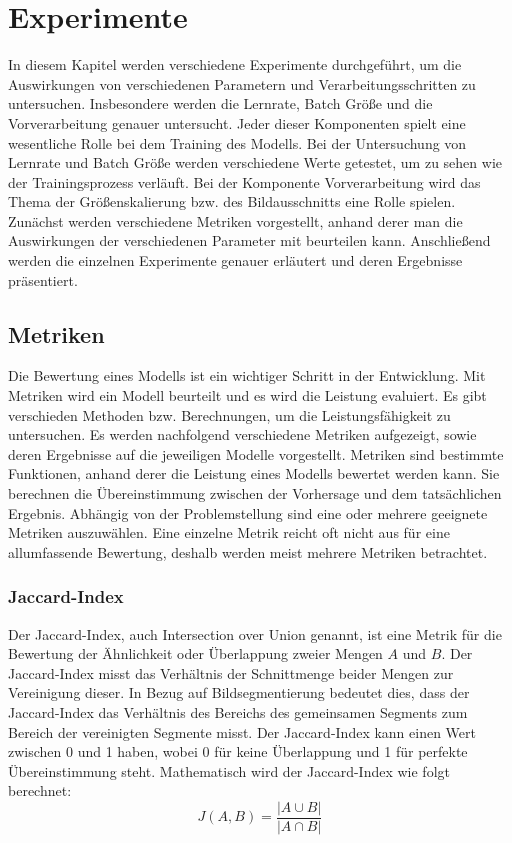 \chapter{Experimente}
In diesem Kapitel werden verschiedene Experimente durchgeführt, um die Auswirkungen von verschiedenen Parametern und Verarbeitungsschritten zu untersuchen. Insbesondere werden die Lernrate, Batch Größe und die Vorverarbeitung genauer untersucht. Jeder dieser Komponenten spielt eine wesentliche Rolle bei dem Training des \gls{Modell}s. Bei der Untersuchung von Lernrate und Batch Größe werden verschiedene Werte getestet, um zu sehen wie der Trainingsprozess verläuft. Bei der Komponente Vorverarbeitung wird das Thema der Größenskalierung bzw. des Bildausschnitts eine Rolle spielen.\\
Zunächst werden verschiedene Metriken vorgestellt, anhand derer man die Auswirkungen der verschiedenen Parameter mit beurteilen kann. Anschließend werden die einzelnen Experimente genauer erläutert und deren Ergebnisse präsentiert.

\section{Metriken}
Die Bewertung eines \gls{Modell}s ist ein wichtiger Schritt in der Entwicklung. Mit Metriken wird ein \gls{Modell} beurteilt und es wird die Leistung evaluiert. Es gibt verschieden Methoden bzw. Berechnungen, um die Leistungsfähigkeit zu untersuchen. Es werden nachfolgend verschiedene Metriken aufgezeigt, sowie deren Ergebnisse auf die jeweiligen \gls{Modell}e vorgestellt.
Metriken sind bestimmte Funktionen, anhand derer die Leistung eines \glspl{Modell} bewertet werden kann. Sie berechnen die Übereinstimmung zwischen der Vorhersage und dem tatsächlichen Ergebnis. Abhängig von der Problemstellung sind eine oder mehrere geeignete Metriken auszuwählen. Eine einzelne Metrik reicht oft nicht aus für eine allumfassende Bewertung, deshalb werden meist mehrere Metriken betrachtet.
\subsection{Jaccard-Index}
Der Jaccard-Index, auch Intersection over Union genannt, ist eine Metrik für die Bewertung der Ähnlichkeit oder Überlappung zweier Mengen $A$ und $B$. Der Jaccard-Index misst das Verhältnis der Schnittmenge beider Mengen zur Vereinigung dieser. In Bezug auf Bildsegmentierung bedeutet dies, dass der Jaccard-Index das Verhältnis des Bereichs des gemeinsamen Segments zum Bereich der vereinigten Segmente misst. Der Jaccard-Index kann einen Wert zwischen 0 und 1 haben, wobei 0 für keine Überlappung und 1 für perfekte Übereinstimmung steht. Mathematisch wird der Jaccard-Index wie folgt berechnet: \cite[vgl.][]{GarciaGarcia2017}
\begin{equation}
	J(A,B) =  \dfrac{\vert A \cup B\vert }{\vert A \cap B\vert}
\end{equation} 

